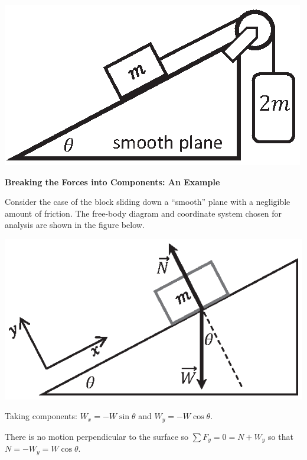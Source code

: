 \vspace{0.3cm}
{\par\centering \includegraphics{friction/smooth_plane_pulley.eps} \par}
\vspace{0.3cm}

\textbf{Breaking the Forces into Components: An Example} 

Consider the case of the block sliding down a ``smooth'' plane
with a negligible amount of friction. The free-body diagram and coordinate system
chosen for analysis are shown in the figure below.

\vspace{0.3cm}
{\par\centering \includegraphics{friction/force_diagram2.eps} \par}
\vspace{0.3cm}

Taking components: \( W_{x}  = -W \sin  \theta  \) and \(W_{y} = -W
\cos  \theta  \).

There is no motion perpendicular to the surface so \( \sum F_y
= 0 = N + W_{y} \) so that $N = -W _{y}  = W \cos \theta$.


